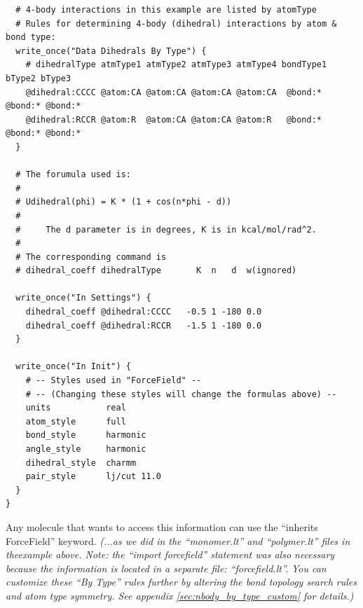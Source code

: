 \documentclass[11pt]{article}
\begin{document}
\begin{verbatim}
  # 4-body interactions in this example are listed by atomType
  # Rules for determining 4-body (dihedral) interactions by atom & bond type:
  write_once("Data Dihedrals By Type") {
    # dihedralType atmType1 atmType2 atmType3 atmType4 bondType1 bType2 bType3
    @dihedral:CCCC @atom:CA @atom:CA @atom:CA @atom:CA  @bond:* @bond:* @bond:*
    @dihedral:RCCR @atom:R  @atom:CA @atom:CA @atom:R   @bond:* @bond:* @bond:*
  }

  # The forumula used is:
  #
  # Udihedral(phi) = K * (1 + cos(n*phi - d))
  #
  #     The d parameter is in degrees, K is in kcal/mol/rad^2.
  #
  # The corresponding command is 
  # dihedral_coeff dihedralType       K  n   d  w(ignored)

  write_once("In Settings") {
    dihedral_coeff @dihedral:CCCC   -0.5 1 -180 0.0
    dihedral_coeff @dihedral:RCCR   -1.5 1 -180 0.0
  }

  write_once("In Init") {
    # -- Styles used in "ForceField" --
    # -- (Changing these styles will change the formulas above) --
    units           real
    atom_style      full
    bond_style      harmonic
    angle_style     harmonic
    dihedral_style  charmm
    pair_style      lj/cut 11.0
  }
}
\end{verbatim}
Any molecule that wants to access this information can use the
``inherits ForceField'' keyword.
\textit{(...as we did in the ``monomer.lt'' and ``polymer.lt'' files in theexample above.
 Note: the ``import forcefield'' statement was also necessary because the
 information is located in a separate file: ``forcefield.lt''.}
\textit{You can customize these ``By Type'' rules further
  by altering the bond topology search rules and atom type symmetry.
  See appendix \ref{sec:nbody_by_type_custom} for details.)}
\end{document}
